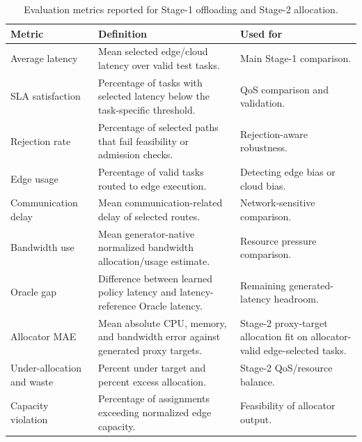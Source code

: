 \begin{table}[!t]
\centering
\caption{Evaluation metrics reported for Stage-1 offloading and Stage-2 allocation.}
\label{tab:evaluation_metrics}
\scriptsize
\begin{tabularx}{\textwidth}{@{}lXX@{}}
\toprule
Metric & Definition & Used for \\
\midrule
Average latency & Mean selected edge/cloud latency over valid test tasks. & Main Stage-1 comparison. \\
SLA satisfaction & Percentage of tasks with selected latency below the task-specific threshold. & QoS comparison and validation. \\
Rejection rate & Percentage of selected paths that fail feasibility or admission checks. & Rejection-aware robustness. \\
Edge usage & Percentage of valid tasks routed to edge execution. & Detecting edge bias or cloud bias. \\
Communication delay & Mean communication-related delay of selected routes. & Network-sensitive comparison. \\
Bandwidth use & Mean generator-native normalized bandwidth allocation/usage estimate. & Resource pressure comparison. \\
Oracle gap & Difference between learned policy latency and latency-reference Oracle latency. & Remaining generated-latency headroom. \\
Allocator MAE & Mean absolute CPU, memory, and bandwidth error against generated proxy targets. & Stage-2 proxy-target allocation fit on allocator-valid edge-selected tasks. \\
Under-allocation and waste & Percent under target and percent excess allocation. & Stage-2 QoS/resource balance. \\
Capacity violation & Percentage of assignments exceeding normalized edge capacity. & Feasibility of allocator output. \\
\bottomrule
\end{tabularx}
\end{table}
